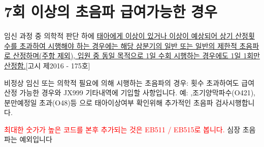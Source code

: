 \section{7회 이상의 초음파 급여가능한 경우}  %
\begin{commentbox}{}
임신 과정 중 의학적 판단 하에 \uline{태아에게 이상이 있거나 이상이 예상되어 상기 산정횟수를 초과하여 시행해야 하는 경우에는 해당 삼분기의 일반 또는 일반의 제한적 초음파로 산정하며(주항 제외), 입원 중 동일 목적으로 1일 수회 시행하는 경우에도 1일 1회만 산정함.}[고시 제2016 - 175호]\par
\noindent 비정상 임신 또는 의학적 필요에 의해 시행하는 초음파의 경우: 횟수 초과하여도 급여 산정 가능한 경우와 JX999 기타내역에 기입할 사항입니다. 예: ,조기양막파수(O421), 분만예정일 초과(O48)등 으로 태아이상여부 확인위해 추가적인 초음파 검사시행합니다. 
\end{commentbox}
\Large \textcolor{red}{최대한 숫가가 높은 코드를 본후 추가되는 것은 EB511 / EB515로 봅니다.} 심장 초음파는 예외입니다 \normalsize
\prezi{\clearpage}

